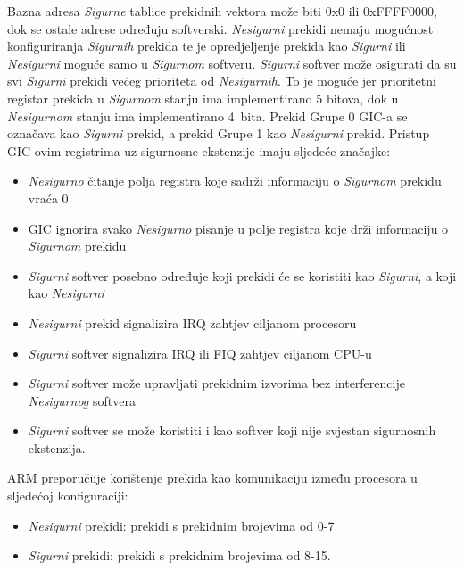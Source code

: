 \documentclass[times, utf8, diplomski, numeric]{fer}
\begin{document}
Bazna adresa \textit{Sigurne} tablice prekidnih vektora može biti 0x0 ili 0xFFFF0000, dok se ostale adrese određuju softverski.
\textit{Nesigurni} prekidi nemaju mogućnost konfiguriranja \textit{Sigurnih} prekida te je opredjeljenje prekida kao \textit{Sigurni} ili \textit{Nesigurni}
moguće samo u \textit{Sigurnom} softveru. \textit{Sigurni} softver može osigurati da su svi \textit{Sigurni} prekidi većeg prioriteta od \textit{Nesigurnih}.
To je moguće jer prioritetni registar prekida u \textit{Sigurnom} stanju ima implementirano 5 bitova, dok u \textit{Nesigurnom} stanju ima
implementirano 4~bita.
Prekid Grupe 0 GIC-a se označava kao \textit{Sigurni} prekid, a prekid Grupe 1 kao \textit{Nesigurni} prekid. Pristup GIC-ovim registrima uz
sigurnosne ekstenzije imaju sljedeće značajke:
\begin{itemize}
  \item{\textit{Nesigurno} čitanje polja registra koje sadrži informaciju o \textit{Sigurnom} prekidu vraća 0}
  \item{GIC ignorira svako \textit{Nesigurno} pisanje u polje registra koje drži informaciju o \textit{Sigurnom} prekidu}
  \item{\textit{Sigurni} softver posebno određuje koji prekidi će se koristiti kao \textit{Sigurni}, a koji kao \textit{Nesigurni}}
  \item{\textit{Nesigurni} prekid signalizira IRQ zahtjev ciljanom procesoru}
  \item{\textit{Sigurni} softver signalizira IRQ ili FIQ zahtjev ciljanom CPU-u}
  \item{\textit{Sigurni} softver može upravljati prekidnim izvorima bez interferencije \textit{Nesigurnog} softvera}
  \item{\textit{Sigurni} softver se može koristiti i kao softver koji nije svjestan sigurnosnih ekstenzija.}
\end{itemize}
ARM preporučuje korištenje prekida kao komunikaciju između procesora u sljedećoj konfiguraciji:
\begin{itemize}
  \item{\textit{Nesigurni} prekidi: prekidi s prekidnim brojevima od 0-7}
  \item{\textit{Sigurni} prekidi: prekidi s prekidnim brojevima od 8-15.}
\end{itemize}
\end{document}
